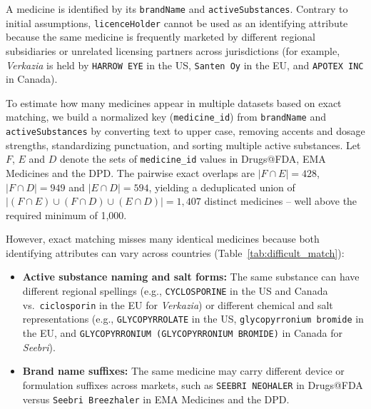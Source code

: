 \documentclass[a4paper,oneside,bibliography=totoc]{scrbook}
\begin{document}
A medicine is identified by its \texttt{brandName} and \texttt{activeSubstances}. Contrary
to initial assumptions, \texttt{licenceHolder} cannot be used as an identifying attribute
because the same medicine is frequently marketed by different regional subsidiaries or
unrelated licensing partners across jurisdictions (for example, \textit{Verkazia} is held
by \texttt{HARROW EYE} in the US, \texttt{Santen Oy} in the EU, and \texttt{APOTEX INC} in
Canada).

To estimate how many medicines appear in multiple datasets based on exact matching, we build
a normalized key (\texttt{medicine\_id}) from \texttt{brandName} and \texttt{activeSubstances}
by converting text to upper case, removing accents and dosage strengths, standardizing
punctuation, and sorting multiple active substances. Let $F$, $E$ and $D$ denote the sets of
\texttt{medicine\_id} values in Drugs@FDA, EMA Medicines and the DPD. The pairwise exact
overlaps are $|F \cap E| = 428$, $|F \cap D| = 949$ and $|E \cap D| = 594$, yielding a
deduplicated union of $\left|(F \cap E) \cup (F \cap D) \cup (E \cap D)\right| = 1{,}407$
distinct medicines -- well above the required minimum of 1,000.

However, exact matching misses many identical medicines because both identifying attributes
can vary across countries (Table~\ref{tab:difficult_match}):
\begin{itemize}
  \item \textbf{Active substance naming and salt forms:} The same substance can have different
  regional spellings (e.g., \texttt{CYCLOSPORINE} in the US and Canada vs.\
  \texttt{ciclosporin} in the EU for \textit{Verkazia}) or different chemical and salt
  representations (e.g., \texttt{GLYCOPYRROLATE} in the US, \texttt{glycopyrronium bromide}
  in the EU, and \texttt{GLYCOPYRRONIUM (GLYCOPYRRONIUM BROMIDE)} in Canada for
  \textit{Seebri}).
  \item \textbf{Brand name suffixes:} The same medicine may carry different device or
  formulation suffixes across markets, such as \texttt{SEEBRI NEOHALER} in Drugs@FDA versus
  \texttt{Seebri Breezhaler} in EMA Medicines and the DPD.
\end{itemize}
\end{document}
